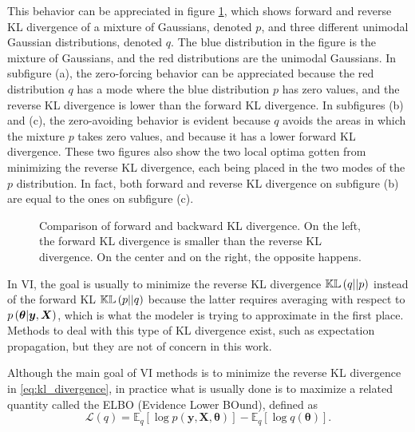 This behavior can be appreciated in figure \ref{fig:KL_example}, which shows forward and reverse KL divergence of a mixture of Gaussians, denoted $p$, and three different unimodal Gaussian distributions, denoted $q$. The blue distribution in the figure is the mixture of Gaussians, and the red distributions are the unimodal Gaussians.
In subfigure (a), the zero-forcing behavior can be appreciated because the red distribution $q$ has a mode where the blue distribution $p$ has zero values, and the reverse KL divergence is lower than the forward KL divergence.
In subfigures (b) and (c), the zero-avoiding behavior is evident because $q$ avoids the areas in which the mixture $p$ takes zero values, and because it has a lower forward KL divergence. These two figures also show the two local optima gotten from minimizing the reverse KL divergence, each being placed in the two modes of the $p$ distribution. In fact, both forward and reverse KL divergence on subfigure (b) are equal to the ones on subfigure (c).

\begin{figure}[H]
  \centering
  \hfill
  \hfill
  \caption{Comparison of forward and backward KL divergence. On the left, the forward KL divergence is smaller than the reverse KL divergence. On the center and on the right, the opposite happens.}
  \label{fig:KL_example}
\end{figure}

In VI, the goal is usually to minimize the reverse KL divergence $\mathbb{KL}\left( q || p \right)$ instead of the forward KL $\mathbb{KL}\left( p || q \right)$ because the latter requires averaging with respect to $p\left( \boldsymbol{\theta} | \boldsymbol{y}, \boldsymbol{X} \right)$, which is what the modeler is trying to approximate in the first place. Methods to deal with this type of KL divergence exist, such as expectation propagation, but they are not of concern in this work.

Although the main goal of VI methods is to minimize the reverse KL divergence in \eqref{eq:kl_divergence}, in practice what is usually done is to maximize a related quantity called the ELBO (Evidence Lower BOund), defined as
\begin{equation}
  \label{eq:elbo_def}
  \mathcal{L}(q) = \mathbb{E}_q\left[ \log p(\boldsymbol{y}, \boldsymbol{X}, \boldsymbol{\theta}) \right] - \mathbb{E}_q\left[ \log q(\boldsymbol{\theta}) \right].
\end{equation}

